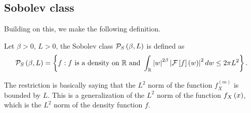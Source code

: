 \subsection{Sobolev class}
Building on this, we make the following definition.
\begin{definition}\label{def:sobolev_class}
	Let $\beta>0$, $L>0$, the Sobolev class $\mathcal{P}_S\left(\beta,L\right)$ is defined as
	\begin{equation*}
		\mathcal{P}_S\left(\beta,L\right) = \left\{f: f \text{ is a density on }  \mathbb{R} \text{ and } \int_{\mathbb{R}}\left| w\right|^{2\beta} \left| \mathcal{F}\left[f\right]\left(w\right)\right|^2 dw \leq 2\pi L^2\right\}.
	\end{equation*}
\end{definition}
The restriction is basically saying that the $L^2$ norm of the function $f_X^{(m)}$ is bounded by $L$. This is a generalization of the $L^2$ norm of the function $f_X\left(x\right)$, which is the $L^2$ norm of the density function $f$.
